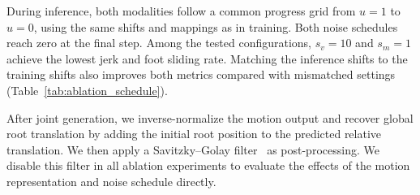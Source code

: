 During inference, both modalities follow a common progress grid from $u=1$ to $u=0$, using the same shifts and mappings as in training. Both noise schedules reach zero at the final step. Among the tested configurations, $s_v=10$ and $s_m=1$ achieve the lowest jerk and foot sliding rate. Matching the inference shifts to the training shifts also improves both metrics compared with mismatched settings (Table~\ref{tab:ablation_schedule}).

After joint generation, we inverse-normalize the motion output and recover global root translation by adding the initial root position to the predicted relative translation. We then apply a Savitzky--Golay filter~\citep{savitzky1964smoothing} as post-processing. We disable this filter in all ablation experiments to evaluate the effects of the motion representation and noise schedule directly.


